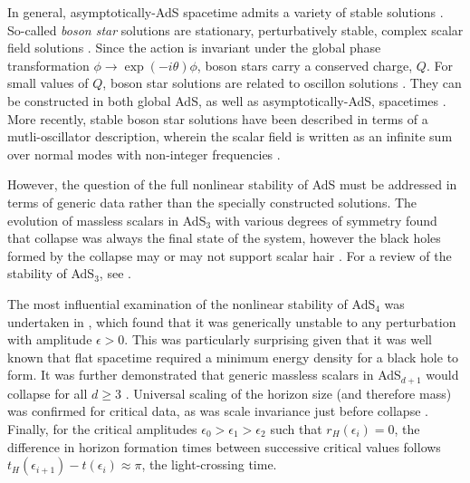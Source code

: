 \documentclass[../PhD.tex]{subfiles}
\begin{document}
In general, asymptotically-AdS spacetime admits a variety of stable solutions \cite{1208.5772}. So-called \emph{boson star} solutions are stationary, perturbatively stable, complex scalar field solutions \cite{gr-qc/0309131}. Since the \ads action is invariant under the global phase transformation $\phi \to \exp(-i\theta) \phi$, boson stars carry a conserved charge, $Q$. For small values of $Q$, boson star solutions are related to oscillon solutions \cite{1304.4166}. They can be constructed in both global AdS, as well as asymptotically-AdS, spacetimes \cite{1209.2378}. More recently, stable boson star solutions have been described in terms of a mutli-oscillator description, wherein the scalar field is written as an infinite sum over normal modes with non-integer frequencies \cite{1904.02168}.

However, the question of the full nonlinear stability of AdS must be addressed in terms of generic data rather than the specially constructed solutions. The evolution of massless scalars in AdS$_3$ with various degrees of symmetry found that collapse was always the final state of the system, however the black holes formed by the collapse may or may not support scalar hair \cite{gr-qc/0007008, gr-qc/0008060, 1303.3186, 1211.7076}. For a review of the stability of AdS$_3$, see \cite{1311.7409}. 

The most influential examination of the nonlinear stability of AdS$_4$ was undertaken in \cite{1104.3702}, which found that it was generically unstable to any perturbation with amplitude $\epsilon > 0$. This was particularly surprising given that it was well known that flat spacetime required a minimum energy density for a black hole to form. It was further demonstrated that generic massless scalars in AdS$_{d+1}$ would collapse for all $d \geq 3$ \cite{1106.2339, 1108.4539}. Universal scaling of the horizon size (and therefore mass) was confirmed for critical data, as was scale invariance just before collapse \cite{1110.5823}. Finally, for the critical amplitudes {$\epsilon_0 > \epsilon_1 > \epsilon_2$} such that $r_H(\epsilon_i) = 0$, the difference in horizon formation times between successive critical values follows {$t_H(\epsilon_{i+1}) - t(\epsilon_i) \approx \pi$}, the light-crossing time.
\end{document}
